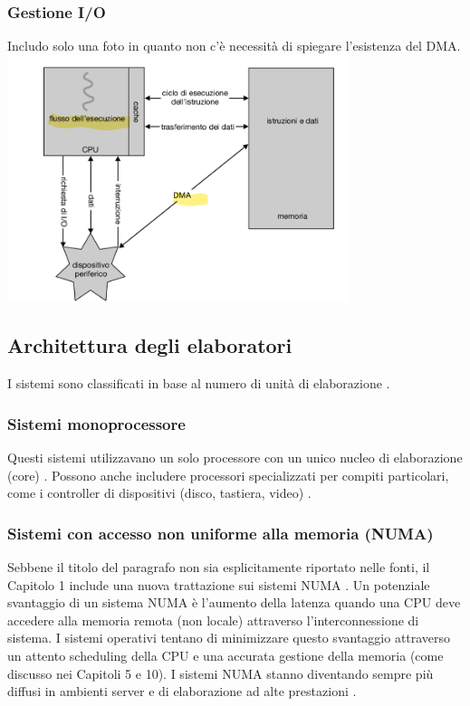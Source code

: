 \documentclass[12pt,a4paper, openany]{book}
\begin{document}
\begin{small}
		\subsubsection{Gestione I/O}
		Includo solo una foto in quanto non c'è necessità di spiegare l'esistenza del DMA.\newline 
		\includegraphics[width=10cm,center]{img/1.1.2.5}
		\subsection{Architettura degli elaboratori} I sistemi sono classificati in base al numero di unità di elaborazione
		.
		\subsubsection{Sistemi monoprocessore} Questi sistemi utilizzavano un solo processore con un unico nucleo di elaborazione (core)
		. Possono anche includere processori specializzati per compiti particolari, come i controller di dispositivi (disco, tastiera, video)
		.
		\subsubsection{Sistemi con accesso non uniforme alla memoria (NUMA)} Sebbene il titolo del paragrafo non sia esplicitamente riportato nelle fonti, il Capitolo 1 include una nuova trattazione sui sistemi NUMA
		. Un potenziale svantaggio di un sistema NUMA è l'aumento della latenza quando una CPU deve accedere alla memoria remota (non locale) attraverso l’interconnessione di sistema. I sistemi operativi tentano di minimizzare questo svantaggio attraverso un attento scheduling della CPU e una accurata gestione della memoria (come discusso nei Capitoli 5 e 10). I sistemi NUMA stanno diventando sempre più diffusi in ambienti server e di elaborazione ad alte prestazioni
		.
		\newpage

\end{small}
\end{document}
